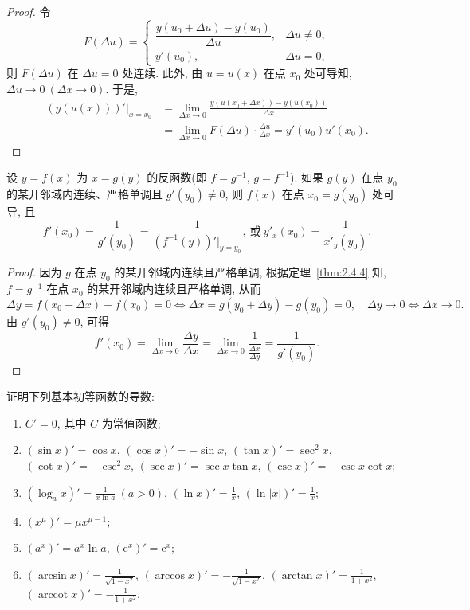 \begin{proof}
令
\[
F(\Delta u) = \begin{cases}
\dfrac{y(u_0+\Delta u) - y(u_0)}{\Delta u}, & \Delta u \neq 0,\\
y'(u_0), & \Delta u = 0,
\end{cases}
\]
则 $F(\Delta u)$ 在 $\Delta u = 0$ 处连续. 此外, 由 $u = u(x)$ 在点 $x_0$ 处可导知, $\Delta u \to 0\ (\Delta x \to 0)$. 于是,
\[
\begin{aligned}
(y(u(x)))'|_{x=x_0} &= \lim_{\Delta x\to0}\frac{y(u(x_0+\Delta x)) - y(u(x_0))}{\Delta x}\\
&= \lim_{\Delta x\to0}F(\Delta u)\cdot\frac{\Delta u}{\Delta x} = y'(u_0)u'(x_0).
\end{aligned}
\]
\end{proof}

\begin{theorem}[反函数的求导法则]\label{thm:3.1.5}
设 $y = f(x)$ 为 $x = g(y)$ 的反函数(即 $f = g^{-1}$, $g = f^{-1}$). 如果 $g(y)$ 在点 $y_0$ 的某开邻域内连续、严格单调且 $g'(y_0) \neq 0$, 则 $f(x)$ 在点 $x_0 = g(y_0)$ 处可导, 且
\[
f'(x_0) = \frac{1}{g'(y_0)} = \frac{1}{(f^{-1}(y))'|_{y=y_0}},\ \text{或}\ y'_x(x_0) = \frac{1}{x'_y(y_0)}.
\]
\end{theorem}

\begin{proof}
因为 $g$ 在点 $y_0$ 的某开邻域内连续且严格单调, 根据定理~\ref{thm:2.4.4} 知, $f = g^{-1}$ 在点 $x_0$ 的某开邻域内连续且严格单调, 从而
\[
\Delta y = f(x_0+\Delta x) - f(x_0) = 0 \iff \Delta x = g(y_0+\Delta y) - g(y_0) = 0,\quad \Delta y \to 0 \iff \Delta x \to 0.
\]
由 $g'(y_0) \neq 0$, 可得
\[
f'(x_0) = \lim_{\Delta x\to0}\frac{\Delta y}{\Delta x} = \lim_{\Delta x\to0}\frac{1}{\frac{\Delta x}{\Delta y}} = \frac{1}{g'(y_0)}.
\]
\end{proof}

\begin{example}\label{ex:3.1.5}
证明下列基本初等函数的导数:
\begin{enumerate}[label=(\arabic*)]
  \item $C' = 0$, 其中 $C$ 为常值函数;
  \item $(\sin x)' = \cos x$, $(\cos x)' = -\sin x$, $(\tan x)' = \sec^2 x$, $(\cot x)' = -\csc^2 x$, $(\sec x)' = \sec x\tan x$, $(\csc x)' = -\csc x\cot x$;
  \item $(\log_a x)' = \frac{1}{x\ln a}\ (a>0)$, $(\ln x)' = \frac{1}{x}$, $(\ln|x|)' = \frac{1}{x}$;
  \item $(x^\mu)' = \mu x^{\mu-1}$;
  \item $(a^x)' = a^x\ln a$, $(\mathrm{e}^x)' = \mathrm{e}^x$;
  \item $(\arcsin x)' = \frac{1}{\sqrt{1-x^2}}$, $(\arccos x)' = -\frac{1}{\sqrt{1-x^2}}$, $(\arctan x)' = \frac{1}{1+x^2}$, $(\operatorname{arccot} x)' = -\frac{1}{1+x^2}$.
\end{enumerate}
\end{example}

